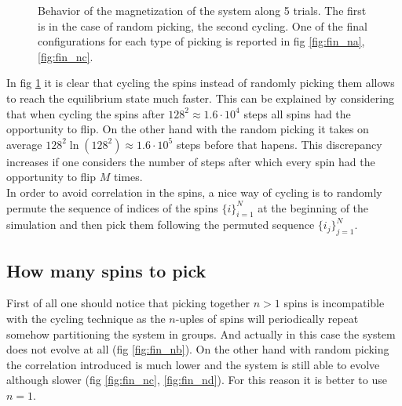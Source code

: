 \documentclass[a4paper, 11pt]{article}
\begin{document}
      \begin{figure}[H]
        \centering
         \quad
        \caption{Behavior of the magnetization of the system along 5 trials. The first is in the case of random picking, the second cycling. One of the final configurations for each type of picking is reported in fig \ref{fig:fin_na}, \ref{fig:fin_nc}.}
        \label{fig:pick_m}
      \end{figure}

      In fig \ref{fig:pick_m} it is clear that cycling the spins instead of randomly picking them allows to reach the equilibrium state much faster. This can be explained by considering that when cycling the spins after $128^2 \approx 1.6\cdot10^4$ steps all spins had the opportunity to flip. On the other hand with the random picking it takes on average $128^2 \ln (128^2) \approx 1.6\cdot10^5$ steps before that hapens. This discrepancy increases if one considers the number of steps after which every spin had the opportunity to flip $M$ times.\\
      In order to avoid correlation in the spins, a nice way of cycling is to randomly permute the sequence of indices of the spins $\{i\}_{i=1}^N$ at the beginning of the simulation and then pick them following the permuted sequence $\{i_j\}_{j=1}^N$.

    \subsection{How many spins to pick}
      First of all one should notice that picking together $n > 1$ spins is incompatible with the cycling technique as the $n$-uples of spins will periodically repeat somehow partitioning the system in groups. And actually in this case the system does not evolve at all (fig \ref{fig:fin_nb}).
      On the other hand with random picking the correlation introduced is much lower and the system is still able to evolve although slower (fig \ref{fig:fin_nc}, \ref{fig:fin_nd}). For this reason it is better to use $n = 1$.
\end{document}

